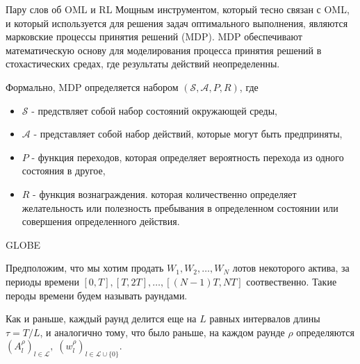 \documentclass[aspectratio=169]{beamer}
\begin{document}
    \begin{frame}{Пару слов об OML и RL}
        Мощным инструментом, который тесно связан с OML, и который используется для решения задач оптимального выполнения, являются марковские процессы принятия решений (MDP). MDP обеспечивают математическую основу для моделирования процесса принятия решений в стохастических средах, где результаты действий неопределенны.

        Формально, MDP определяется набором $(\mathcal S, \mathcal A, P, R)$, где
    
        \begin{itemize}
    
            \item $\mathcal S$ - предствляет собой набор состояний окружающей среды,
            
            \item $\mathcal A$ - представляет собой набор действий, которые могут быть предприняты,
    
            \item $P$ - функция переходов, которая определяет вероятность перехода из одного состояния в другое,
    
            \item $R$ - функция вознаграждения. которая количественно определяет желательность или полезность пребывания в определенном состоянии или совершения определенного действия.
        \end{itemize}
    
    \end{frame}

    \begin{frame}{GLOBE}

        Предположим, что мы хотим продать $W_1, W_2, \ldots, W_N$ лотов некоторого актива, за периоды времени $[0, T], [T, 2T], \ldots, [(N-1)T, NT]$ соотвественно. Такие пероды времени будем называть раундами.
        
        Как и раньше, каждый раунд делится еще на $L$ равных интервалов длины $\tau = T/L$, и аналогично тому, что было раньше, на каждом раунде $\rho$ определяются $(A_l^\rho)_{l \in \mathcal L}, \; (w_l^\rho)_{l \in \mathcal L \cup \{0\}}$.

    \end{frame}
\end{document}
